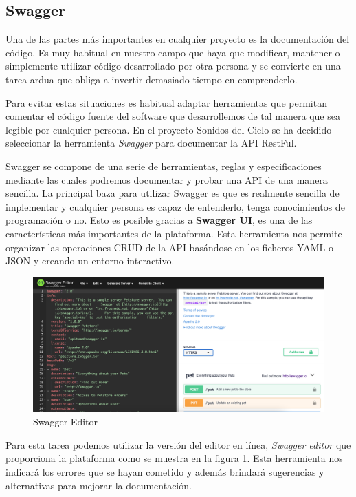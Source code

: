 \newpage
\subsection{Swagger}
Una de las partes más importantes en cualquier proyecto es la documentación del código. Es muy habitual en nuestro campo que haya que modificar, mantener o simplemente utilizar código desarrollado por otra persona y se convierte en una tarea ardua que obliga a invertir demasiado tiempo en comprenderlo. 

Para evitar estas situaciones es habitual adaptar herramientas que permitan comentar el código fuente del software que desarrollemos de tal manera que sea legible por cualquier persona. En el proyecto Sonidos del Cielo se ha decidido seleccionar la herramienta \textit{Swagger}\cite{Swagger} para documentar la API RestFul. 

Swagger se compone de una serie de herramientas, reglas y especificaciones mediante las cuales podremos documentar y probar una API de una manera sencilla. La principal baza para utilizar Swagger es que es realmente sencilla de implementar y cualquier persona es capaz de entenderlo, tenga conocimientos de programación o no. Esto es posible gracias a \textbf{Swagger UI}, es una de las características más importantes de la plataforma. Esta herramienta nos permite organizar las operaciones CRUD de la API basándose en los ficheros YAML o JSON y creando un entorno interactivo.

\begin{figure}[H]
    \centering
    \includegraphics[width=\textwidth]{include/capturas/SwaggerEditorOnline.png}
    \caption{Swagger Editor}
    \label{fig:swagger_online}
\end{figure}

Para esta tarea podemos utilizar la versión del editor en línea, \textit{Swagger editor} que proporciona la plataforma como se muestra en la figura \ref{fig:swagger_online}. Esta herramienta nos indicará los errores que se hayan cometido y además brindará sugerencias y alternativas para mejorar la documentación.

